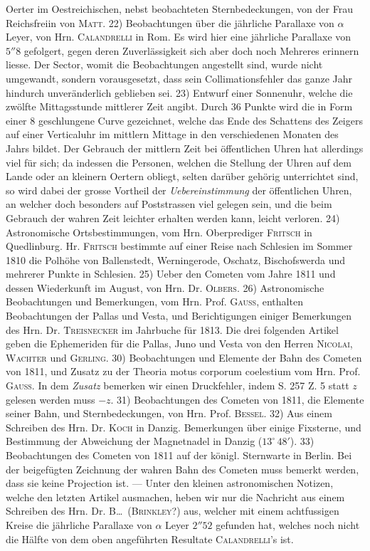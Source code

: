Oerter im Oestreichischen, nebst beobachteten Sternbedeckungen, von der Frau Reichsfreiin von \textsc{Matt}. 22) Beobachtungen über die jährliche Parallaxe von $\alpha$ Leyer, von Hrn. \textsc{Calandrelli} in Rom. Es wird hier eine jährliche Parallaxe von $5''8$ gefolgert, gegen deren Zuverlässigkeit sich aber doch noch Mehreres erinnern liesse. Der Sector, womit die Beobachtungen angestellt sind, wurde nicht umgewandt, sondern vorausgesetzt, dass sein Collimationsfehler das ganze Jahr hindurch unveränderlich geblieben sei. 23) Entwurf einer Sonnenuhr, welche die zwölfte Mittagsstunde mittlerer Zeit angibt. Durch 36 Punkte wird die in Form einer 8 geschlungene Curve gezeichnet, welche das Ende des Schattens des Zeigers auf einer Verticaluhr im mittlern Mittage in den verschiedenen Monaten des Jahrs bildet. Der Gebrauch der mittlern Zeit bei öffentlichen Uhren hat allerdings viel für sich; da indessen die Personen, welchen die Stellung der Uhren auf dem Lande oder an kleinern Oertern obliegt, selten darüber gehörig unterrichtet sind, so wird dabei der grosse Vortheil der \emph{Uebereinstimmung} der öffentlichen Uhren, an welcher doch besonders auf Poststrassen viel gelegen sein, und die beim Gebrauch der wahren Zeit leichter erhalten werden kann, leicht verloren. 24) Astronomische Ortsbestimmungen, vom Hrn. Oberprediger \textsc{Fritsch} in Quedlinburg. Hr. \textsc{Fritsch} bestimmte auf einer Reise nach Schlesien im Sommer 1810 die Polhöhe von Ballenstedt, Werningerode, Oschatz, Bischofswerda und mehrerer Punkte in Schlesien. 25) Ueber den Cometen vom Jahre 1811 und dessen Wiederkunft im August, von Hrn. Dr. \textsc{Olbers}. 26) Astronomische Beobachtungen und Bemerkungen, vom Hrn. Prof. \textsc{Gauss}, enthalten Beobachtungen der Pallas und Vesta, und Berichtigungen einiger Bemerkungen des Hrn. Dr. \textsc{Treisnecker} im Jahrbuche für 1813. Die drei folgenden Artikel geben die Ephemeriden für die Pallas, Juno und Vesta von den Herren \textsc{Nicolai}, \textsc{Wachter} und \textsc{Gerling}. 30) Beobachtungen und Elemente der Bahn des Cometen von 1811, und Zusatz zu der Theoria motus corporum coelestium vom Hrn. Prof. \textsc{Gauss}. In dem \emph{Zusatz} bemerken wir einen Druckfehler, indem S. 257 Z. 5 statt $z$ gelesen werden muss $-z$. 31) Beobachtungen des Cometen von 1811, die Elemente seiner Bahn, und Sternbedeckungen, von Hrn. Prof. \textsc{Bessel}. 32) Aus einem Schreiben des Hrn. Dr. \textsc{Koch} in Danzig. Bemerkungen über einige Fixsterne, und Bestimmung der Abweichung der Magnetnadel in Danzig ($13^\circ\,48'$). 33) Beobachtungen des Cometen von 1811 auf der königl. Sternwarte in Berlin. Bei der beigefügten Zeichnung der wahren Bahn des Cometen muss bemerkt werden, dass sie keine Projection ist. --- Unter den kleinen astronomischen Notizen, welche den letzten Artikel ausmachen, heben wir nur die Nachricht aus einem Schreiben des Hrn. Dr. B\dots\ (\textsc{Brinkley}?) aus, welcher mit einem achtfussigen Kreise die jährliche Parallaxe von $\alpha$ Leyer $2''52$ gefunden hat, welches noch nicht die Hälfte von dem oben angeführten Resultate \textsc{Calandrelli}'s ist.

